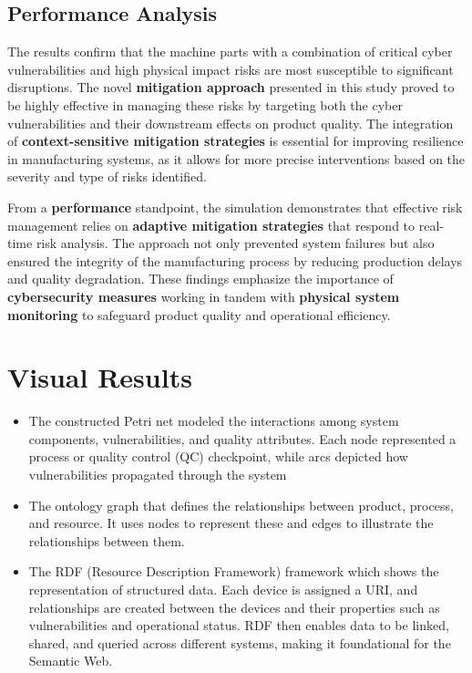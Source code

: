 \documentclass[conference]{IEEEtran}
\begin{document}
\subsection{Performance Analysis}
The results confirm that the machine parts with a combination of critical cyber vulnerabilities and high physical impact risks are most susceptible to significant disruptions. The novel \textbf{mitigation approach} presented in this study proved to be highly effective in managing these risks by targeting both the cyber vulnerabilities and their downstream effects on product quality. The integration of \textbf{context-sensitive mitigation strategies} is essential for improving resilience in manufacturing systems, as it allows for more precise interventions based on the severity and type of risks identified.

From a \textbf{performance} standpoint, the simulation demonstrates that effective risk management relies on \textbf{adaptive mitigation strategies} that respond to real-time risk analysis. The approach not only prevented system failures but also ensured the integrity of the manufacturing process by reducing production delays and quality degradation. These findings emphasize the importance of \textbf{cybersecurity measures} working in tandem with \textbf{physical system monitoring} to safeguard product quality and operational efficiency.


\section{Visual Results}

\begin{itemize}
    \item The constructed Petri net modeled the interactions among system components, vulnerabilities, and quality attributes. Each node represented a process or quality control (QC) checkpoint, while arcs depicted how vulnerabilities propagated through the system
    \item The ontology graph that defines the relationships between product, process, and resource. It uses nodes to represent these and edges to illustrate the relationships between them. 
    \item The RDF (Resource Description Framework) framework which shows the representation of structured data. Each device is assigned a URI, and relationships are created between the devices and their properties such as vulnerabilities and operational status. RDF then enables data to be linked, shared, and queried across different systems, making it foundational for the Semantic Web.
\end{itemize}
\end{document}
